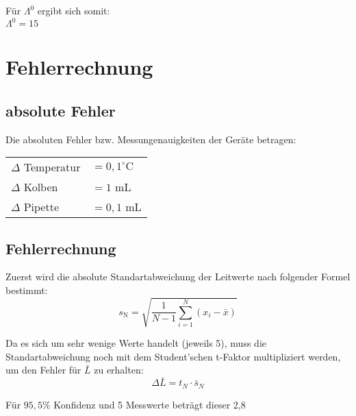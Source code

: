 \documentclass[12pt,a4paper,titlepage,headinclude,bibtotoc]{scrartcl}
\begin{document}
Für $\Lambda^0$ ergibt sich somit:\\
$\Lambda^0 = 15$\\

\section{Fehlerrechnung}

\subsection{absolute Fehler}
Die absoluten Fehler bzw. Messungenauigkeiten der Geräte betragen:\\

\begin{table} [h]
\centering 
\begin{tabular}{p{4cm}p{4cm}}
$\Delta$ Temperatur & $= 0,1^\circ\text{C}$ \\
$\Delta$ Kolben &$= 1$ mL   \\
$\Delta$ Pipette &  $=0,1$ mL \\
\end{tabular}
\end{table}





\subsection{Fehlerrechnung}
Zuerst wird die absolute Standartabweichung der Leitwerte nach folgender Formel bestimmt:\\

\begin{equation}
s_{\mathrm{N}} = \sqrt{\frac{1}{N-1} \sum_{i=1}^{N}(x_i -\bar{x})}
\end{equation} 

Da es sich um sehr wenige Werte handelt (jeweils 5), muss die Standartabweichung noch mit dem Student'schen t-Faktor multipliziert werden, um den Fehler für $\bar{L}$ zu erhalten:\\

\begin{equation}
\Delta \bar{L} = t_N \cdot \bar{s}_N
\end{equation}

Für $95,5 \%$ Konfidenz und 5 Messwerte beträgt dieser 2,8\protect\footnotemark

\end{document}
